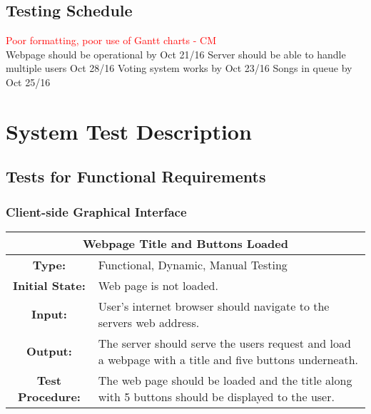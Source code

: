 \documentclass[12pt, titlepage]{article}
\begin{document}
\subsection{Testing Schedule}
\textcolor{red}{Poor formatting, poor use of Gantt charts - CM} \\
Webpage should be operational by Oct 21/16
Server should be able to handle multiple users Oct 28/16
Voting system works by Oct 23/16
Songs in queue by Oct 25/16


\section{System Test Description}

\subsection{Tests for Functional Requirements}

\subsubsection{Client-side Graphical Interface}

\begin{center}
\begin{table}[H]
\begin{tabularx}{\textwidth}{| c X |}
\hline
\multicolumn{2}{|c|}{\textbf{Webpage Title and Buttons Loaded}}\\
\hline
\textbf{Type: } & Functional, Dynamic, Manual Testing\\

\textbf{Initial State: } & Web page is not loaded.\\

\textbf{Input: } & User's internet browser should navigate to the servers web address.\\

\textbf{Output: } & The server should serve the users request and load a webpage with a title and five buttons underneath.\\

\textbf{Test Procedure:  } &   The web page should be loaded and the title along with 5 buttons should be displayed to the user.\\
\hline
\end{tabularx}
\end{table}
\end{center}
\end{document}
